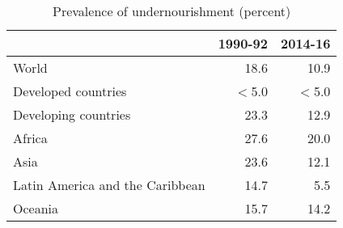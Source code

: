 \begin{table}
\centering
\caption{ Prevalence of undernourishment (percent)} 
{\footnotesize
\begin{tabular}{p{1.7cm}rr}
  \toprule
 & 1990-92 & 2014-16 \\ 
  \midrule
World & 18.6 & 10.9 \\ 
  Developed countries & $<$5.0 & $<$5.0 \\ 
  Developing countries & 23.3 & 12.9 \\ 
  Africa & 27.6 & 20.0 \\ 
  Asia & 23.6 & 12.1 \\ 
  Latin America and 
 the Caribbean & 14.7 & 5.5 \\ 
  Oceania & 15.7 & 14.2 \\ 
   \bottomrule
\end{tabular}
}
\end{table}
